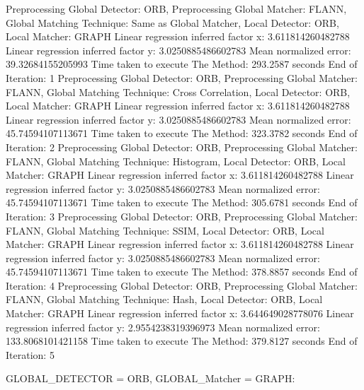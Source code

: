 Preprocessing Global Detector: ORB, Preprocessing Global Matcher: FLANN, Global Matching Technique: Same as Global Matcher, Local Detector: ORB, Local Matcher: GRAPH
Linear regression inferred factor x: 3.611814260482788
Linear regression inferred factor y: 3.0250885486602783
Mean normalized error: 39.32684155205993
Time taken to execute The Method: 293.2587 seconds
End of Iteration: 1
Preprocessing Global Detector: ORB, Preprocessing Global Matcher: FLANN, Global Matching Technique: Cross Correlation, Local Detector: ORB, Local Matcher: GRAPH
Linear regression inferred factor x: 3.611814260482788
Linear regression inferred factor y: 3.0250885486602783
Mean normalized error: 45.74594107113671
Time taken to execute The Method: 323.3782 seconds
End of Iteration: 2
Preprocessing Global Detector: ORB, Preprocessing Global Matcher: FLANN, Global Matching Technique: Histogram, Local Detector: ORB, Local Matcher: GRAPH
Linear regression inferred factor x: 3.611814260482788
Linear regression inferred factor y: 3.0250885486602783
Mean normalized error: 45.74594107113671
Time taken to execute The Method: 305.6781 seconds
End of Iteration: 3
Preprocessing Global Detector: ORB, Preprocessing Global Matcher: FLANN, Global Matching Technique: SSIM, Local Detector: ORB, Local Matcher: GRAPH
Linear regression inferred factor x: 3.611814260482788
Linear regression inferred factor y: 3.0250885486602783
Mean normalized error: 45.74594107113671
Time taken to execute The Method: 378.8857 seconds
End of Iteration: 4
Preprocessing Global Detector: ORB, Preprocessing Global Matcher: FLANN, Global Matching Technique: Hash, Local Detector: ORB, Local Matcher: GRAPH
Linear regression inferred factor x: 3.644649028778076
Linear regression inferred factor y: 2.9554238319396973
Mean normalized error: 133.8068101421158
Time taken to execute The Method: 379.8127 seconds
End of Iteration: 5


GLOBAL\_DETECTOR = ORB, GLOBAL\_Matcher = GRAPH:

